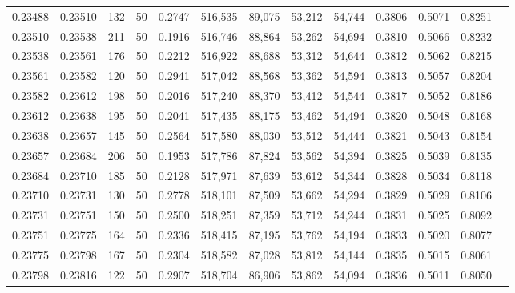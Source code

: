 \begin{tabular}{rrrrrrrrrrrrr}
0.23488 & 0.23510 &   132 &  50 &                                     0.2747 & 516,535 &  89,075 &  53,212 &  54,744 & 0.3806 & 0.5071 & 0.8251 \\
0.23510 & 0.23538 &   211 &  50 &                                     0.1916 & 516,746 &  88,864 &  53,262 &  54,694 & 0.3810 & 0.5066 & 0.8232 \\
0.23538 & 0.23561 &   176 &  50 &                                     0.2212 & 516,922 &  88,688 &  53,312 &  54,644 & 0.3812 & 0.5062 & 0.8215 \\
0.23561 & 0.23582 &   120 &  50 &                                     0.2941 & 517,042 &  88,568 &  53,362 &  54,594 & 0.3813 & 0.5057 & 0.8204 \\
0.23582 & 0.23612 &   198 &  50 &                                     0.2016 & 517,240 &  88,370 &  53,412 &  54,544 & 0.3817 & 0.5052 & 0.8186 \\
0.23612 & 0.23638 &   195 &  50 &                                     0.2041 & 517,435 &  88,175 &  53,462 &  54,494 & 0.3820 & 0.5048 & 0.8168 \\
0.23638 & 0.23657 &   145 &  50 &                                     0.2564 & 517,580 &  88,030 &  53,512 &  54,444 & 0.3821 & 0.5043 & 0.8154 \\
0.23657 & 0.23684 &   206 &  50 &                                     0.1953 & 517,786 &  87,824 &  53,562 &  54,394 & 0.3825 & 0.5039 & 0.8135 \\
0.23684 & 0.23710 &   185 &  50 &                                     0.2128 & 517,971 &  87,639 &  53,612 &  54,344 & 0.3828 & 0.5034 & 0.8118 \\
0.23710 & 0.23731 &   130 &  50 &                                     0.2778 & 518,101 &  87,509 &  53,662 &  54,294 & 0.3829 & 0.5029 & 0.8106 \\
0.23731 & 0.23751 &   150 &  50 &                                     0.2500 & 518,251 &  87,359 &  53,712 &  54,244 & 0.3831 & 0.5025 & 0.8092 \\
0.23751 & 0.23775 &   164 &  50 &                                     0.2336 & 518,415 &  87,195 &  53,762 &  54,194 & 0.3833 & 0.5020 & 0.8077 \\
0.23775 & 0.23798 &   167 &  50 &                                     0.2304 & 518,582 &  87,028 &  53,812 &  54,144 & 0.3835 & 0.5015 & 0.8061 \\
0.23798 & 0.23816 &   122 &  50 &                                     0.2907 & 518,704 &  86,906 &  53,862 &  54,094 & 0.3836 & 0.5011 & 0.8050 \\

\end{tabular}
